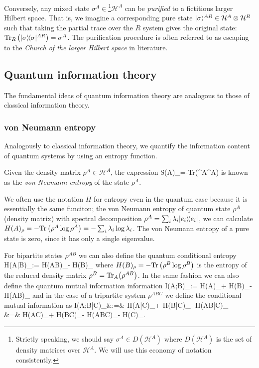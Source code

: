 \documentclass[aps,11pt,twoside,letterpaper]{article}
\def\Tr{\textup{Tr}}
\def\cH{\mathcal{H}}
\theoremstyle{plain}
\theoremstyle{definition}
\begin{document}
			Conversely, any mixed state $\sigma^A \in$\footnote{Strictly speaking, we should say 
			$\sigma^A \in D(\cH^A)$ where $D(\cH^A)$ is the set of density matrices over $\cH^A$. 
			We will use this economy of notation consistently.}$\cH^A$
			 can be \emph{purified} to a fictitious 
			larger Hilbert space. 
			That is, we imagine a corresponding pure state $\ket{\sigma}^{AR} \in \cH^A \otimes \cH^R$
			such that taking the partial trace over the $R$ system gives the original state: 
			$\Tr_R\left(\proj{\sigma}^{AR}\right)=\sigma^A$. 
			The purification procedure is often referred to as escaping to the \emph{Church of the larger
			Hilbert space} in literature.

		
	\subsection{Quantum information theory}
		The fundamental ideas of quantum information theory are analogous to those of classical information theory. 
		\subsubsection{von Neumann entropy}
		
			Analogously to classical information theory, we quantify the information content of quantum systems 
			by using an entropy function.
			
			\begin{definition} 
				Given the density matrix $\rho^A \in \cH^A$, the expression
				\be
					S(A)_\rho=-\Tr\left(\rho^A\log\rho^A\right)
				\ee
				is known as the \emph{von Neumann entropy} of the state $\rho^A$. 
			\end{definition}
		
            We often use the notation $H$ for entropy even in the quantum case because it is essentially
            the same funciton; the von Neumann entropy of quantum state $\rho^A$ (density matrix) 
            with spectral decomposition $\rho^A = \sum_i \lambda_i | e_i \rangle\!\langle e_i |$, we 
			can calculate $H(A)_\rho=-\Tr\left(\rho^A\log\rho^A\right) = - \sum_i \lambda_i \log \lambda_i$.
			The von Neumann entropy of a pure state is zero, since it has only a single eigenvalue.

			
			For bipartite states $\rho^{AB}$ we can also define the quantum conditional entropy
			\be
				H(A|B)_\rho 	:= 		H(AB)_\rho - H(B)_\rho					\label{cond-entrpy} 
			\ee
			where $H(B)_\rho = -\Tr\left(\rho^B\log\rho^B\right)$ is the entropy of the reduced density matrix
			$\rho^B = \Tr_A\!\left( \rho^{AB}\right)$. In the same fashion we can also define the 
			quantum mutual information information
			\be
				I(A;B)_\rho 	:=		H(A)_\rho + H(B)_\rho - H(AB)_\rho 
			\ee
			and in the case of a tripartite system $\rho^{ABC}$ we define the conditional mutual information 
			as 
			\bea
				I(A;B|C)_\rho 	&:=&	H(A|C)_\rho + H(B|C)_\rho - H(AB|C)_\rho \label{cond-mut-info} \\
								&=&		H(AC)_\rho + H(BC)_\rho - H(ABC)_\rho - H(C)_\rho.
			\eea
		    
\end{document}
